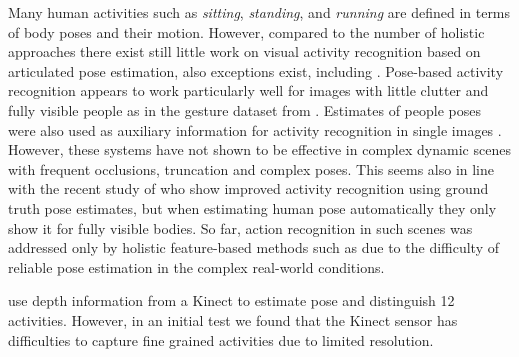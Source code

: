 Many human activities such as \emph{sitting}, \emph{standing}, and \emph{running} are
defined in terms of body poses and their motion. However, compared to the number of holistic approaches 
there exist still little work on visual activity
recognition based on articulated pose estimation, also exceptions exist, including \citep{Ferrari:2008:PSS,singh11iccv,raptis13cvpr}. Pose-based activity
recognition appears to work particularly well for images with little clutter and
fully visible people as in  %
the gesture dataset from \citet{singh11iccv}. Estimates of people poses were also used as auxiliary
information for activity recognition in single images
\citep{Yang:2010:RHA}. However, these systems have not shown to be effective in
complex dynamic scenes with frequent occlusions, truncation and complex
poses. This seems also in line with the recent study of \citet{jhuang13iccv} who show improved activity recognition using ground truth pose estimates, but when estimating human pose automatically they only show it for fully visible bodies. So far, action recognition in such scenes was addressed only by holistic
feature-based methods such as \citep{laptev08cvpr} %
 due to the difficulty of
reliable pose estimation in the complex real-world conditions. 



\citet{sung11corr} use depth information from a Kinect to estimate pose \citep{shotton11cvpr} and distinguish 12 activities. However, in an initial test we found that the Kinect sensor has difficulties to capture fine grained activities due to limited resolution.






